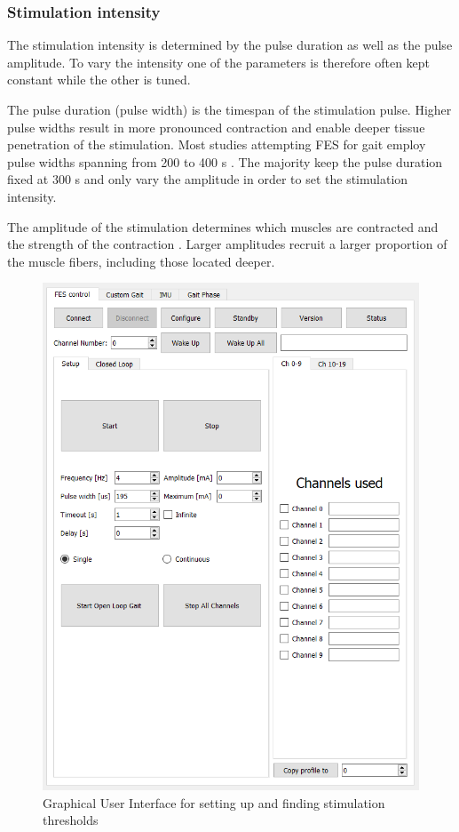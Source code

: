 \subsubsection{Stimulation intensity }
The stimulation intensity is determined by the pulse duration as well as the pulse amplitude. To vary the intensity one of the parameters is therefore often kept constant while the other is tuned. 

The pulse duration (pulse width) is the timespan of the stimulation pulse. Higher pulse widths result in more pronounced contraction and enable deeper tissue penetration of the stimulation. Most studies attempting FES for gait employ pulse widths spanning from 200 to 400 \micro s . The majority keep the pulse duration fixed at 300 \micro s and only vary the amplitude in order to set the stimulation intensity.\cite{aout_effects_2023}

The amplitude of the stimulation determines which muscles are contracted and the strength of the contraction \cite{marquez-chin_functional_2020}. Larger amplitudes recruit a larger proportion of the muscle fibers, including those located deeper. 

\begin{figure} [h]
    \centering
    \includegraphics[width=0.65\linewidth]{images/setupgui.png}
    \caption{Graphical User Interface for setting up and finding stimulation thresholds}
    \label{fig:setupgui}
\end{figure}

